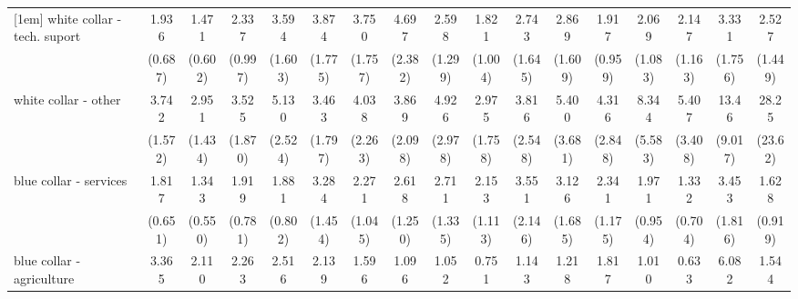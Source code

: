 {\begin{tabular}{l*{16}{c}}
[1em]
white collar - tech. suport&       1.936         &       1.471         &       2.337\sym{*}  &       3.594\sym{**} &       3.874\sym{**} &       3.750\sym{**} &       4.697\sym{**} &       2.598         &       1.821         &       2.743         &       2.869         &       1.917         &       2.069         &       2.147         &       3.331\sym{*}  &       2.527         \\
                    &     (0.687)         &     (0.602)         &     (0.997)         &     (1.603)         &     (1.775)         &     (1.757)         &     (2.382)         &     (1.299)         &     (1.004)         &     (1.645)         &     (1.609)         &     (0.959)         &     (1.083)         &     (1.163)         &     (1.756)         &     (1.449)         \\
[1em]
white collar - other&       3.742\sym{**} &       2.951\sym{*}  &       3.525\sym{*}  &       5.130\sym{***}&       3.463\sym{*}  &       4.038\sym{*}  &       3.869\sym{*}  &       4.926\sym{**} &       2.975         &       3.816\sym{*}  &       5.400\sym{*}  &       4.316\sym{*}  &       8.344\sym{**} &       5.407\sym{**} &       13.46\sym{***}&       28.25\sym{***}\\
                    &     (1.572)         &     (1.434)         &     (1.870)         &     (2.524)         &     (1.797)         &     (2.263)         &     (2.098)         &     (2.978)         &     (1.758)         &     (2.548)         &     (3.681)         &     (2.848)         &     (5.583)         &     (3.408)         &     (9.017)         &     (23.62)         \\
[1em]
blue collar - services&       1.817         &       1.343         &       1.919         &       1.881         &       3.284\sym{**} &       2.271         &       2.618\sym{*}  &       2.711\sym{*}  &       2.153         &       3.551\sym{*}  &       3.126\sym{*}  &       2.341         &       1.971         &       1.332         &       3.453\sym{*}  &       1.628         \\
                    &     (0.651)         &     (0.550)         &     (0.781)         &     (0.802)         &     (1.454)         &     (1.045)         &     (1.250)         &     (1.335)         &     (1.113)         &     (2.146)         &     (1.685)         &     (1.175)         &     (0.954)         &     (0.704)         &     (1.816)         &     (0.919)         \\
[1em]
blue collar - agriculture&       3.365\sym{*}  &       2.110         &       2.263         &       2.516         &       2.139         &       1.596         &       1.096         &       1.052         &       0.751         &       1.143         &       1.218         &       1.817         &       1.010         &       0.633         &       6.082\sym{*}  &       1.544         \\

\end{tabular}}
